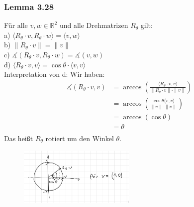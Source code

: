 \documentclass{article}
\begin{document}
\subsubsection*{Lemma 3.28}
Für alle $v,w \in \mathbb{R}^2$ und alle Drehmatrizen $R_\theta$ gilt: \\
a) $\langle R_\theta \cdot v, R_\theta \cdot w \rangle = \langle v,w \rangle$ \\
b) $\|R_\theta \cdot v\| = \|v\|$ \\
c) $\measuredangle (R_\theta \cdot v, R_\theta \cdot w) = \measuredangle (v,w)$ \\
d) $\langle R_\theta \cdot v, v \rangle = \cos \theta \cdot \langle v,v \rangle$ \\
Interpretation von d: 
Wir haben:
\begin{align*}
    \measuredangle (R_\theta \cdot v, v) &= \arccos \left( \frac{\langle R_\theta \cdot v, v \rangle}{\|R_\theta \cdot v\| \cdot \|v\|} \right) \\
    &= \arccos \left( \frac{\cos \theta \langle v,v \rangle}{\|v\| \cdot \|v\|} \right) \\
    &= \arccos (\cos \theta) \\
    &= \theta \\
\end{align*}
Das heißt $R_\theta$ rotiert um den Winkel $\theta$. \\
\begin{figure}
    \centering
    \includegraphics[width=0.5\textwidth]{Images/3.28.jpeg}
    \caption{}
\end{figure}
\end{document}
